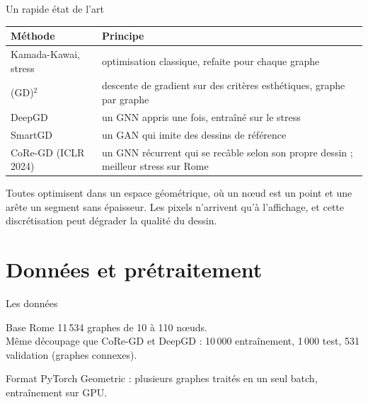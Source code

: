 \documentclass[aspectratio=169,11pt]{beamer}
\begin{document}
\begin{frame}{Un rapide état de l'art}
\small
\begin{tabularx}{\textwidth}{@{}l X@{}}
\toprule
\textbf{Méthode} & \textbf{Principe} \\
\midrule
Kamada-Kawai, stress & optimisation classique, refaite pour chaque graphe \\
(GD)$^2$ & descente de gradient sur des critères esthétiques, graphe par graphe \\
DeepGD & un GNN appris une fois, entraîné sur le stress \\
SmartGD & un GAN qui imite des dessins de référence \\
CoRe-GD (ICLR 2024) & un GNN récurrent qui se recâble selon son propre dessin ; meilleur stress sur Rome \\
\bottomrule
\end{tabularx}

\vspace{0.5cm}
\textcolor{gris}{Toutes optimisent dans un espace géométrique, où un nœud est un point et une arête un segment sans épaisseur. Les pixels n'arrivent qu'à l'affichage, et cette discrétisation peut dégrader la qualité du dessin.}
\end{frame}

\section{Données et prétraitement}

\begin{frame}{Les données}
\begin{block}{Base Rome}
\small 11\,534 graphes de 10 à 110 nœuds.\\
Même découpage que CoRe-GD et DeepGD : 10\,000 entraînement, 1\,000 test, 531 validation (graphes connexes).
\end{block}

\vspace{0.4cm}
\small Format PyTorch Geometric : plusieurs graphes traités en un seul batch, entraînement sur GPU.

\vspace{0.4cm}
\end{frame}
\end{document}
